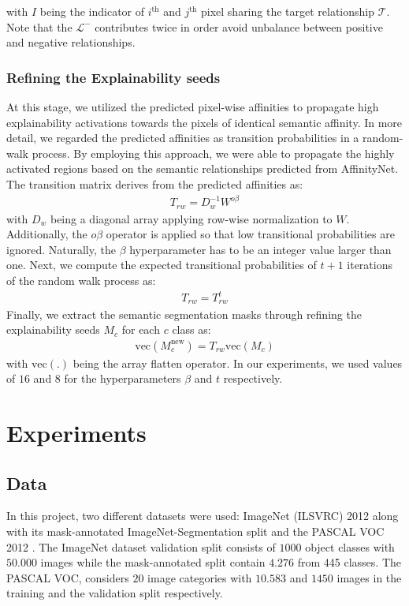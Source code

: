 with $I$ being the indicator of $i^\text{th}$ and $j^\text{th}$ pixel sharing the target relationship $\mathcal{T}$. Note that the $\mathcal{L}^-$ contributes twice in order avoid unbalance between positive and negative relationships.

\subsubsection{Refining the Explainability seeds}
At this stage, we utilized the predicted pixel-wise affinities to propagate high explainability activations towards the pixels of identical semantic affinity. In more detail, we regarded the predicted affinities as transition probabilities in a random-walk process. By employing this approach, we were able to propagate the highly activated regions based on the semantic relationships predicted from AffinityNet. The transition matrix derives from the predicted affinities as: 
\begin{align*}
T_{rw}=D_{w}^{-1} W^{o \beta}
\end{align*}
with $D_w$ being a diagonal array applying row-wise normalization to $W$. Additionally, the $o\beta$ operator is applied so that low transitional probabilities are ignored. Naturally, the $\beta$ hyperparameter has to be an integer value larger than one. Next, we compute the expected transitional probabilities of $t+1$ iterations of the random walk process as:
\begin{align*}
T_{rw}=T_{rw}^{t}
\end{align*}
Finally, we extract the semantic segmentation masks through refining the explainability seeds $M_c$ for each $c$ class as:
\begin{align*}
\text{vec}(M_c^\text{new})=T_{rw}\text{vec}(M_c)
\end{align*}
with $\text{vec}(.)$ being the array flatten operator. In our experiments, we used values of $16$ and $8$ for the hyperparameters $\beta$ and $t$ respectively.


\section{Experiments}

\subsection{Data}

In this project, two different datasets were used: ImageNet \cite{russakovsky2015ImageNet} (ILSVRC) 2012 along with its mask-annotated ImageNet-Segmentation \cite{imagenet-seg} split and the PASCAL VOC 2012 \cite{pascalvoc}. The ImageNet dataset validation split consists of $1000$ object classes with $50.000$ images while the mask-annotated split contain $4.276$ from 445 classes. The PASCAL VOC, considers $20$ image categories with $10.583$ and $1450$ images in the training and the validation split respectively.


